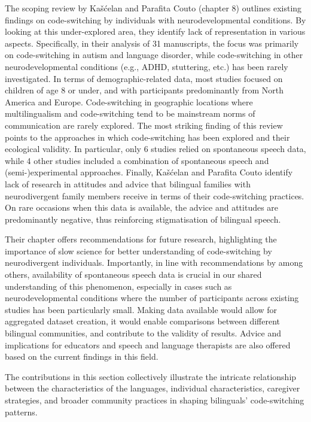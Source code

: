 \documentclass[output=paper]{langscibook}
\begin{document}
The scoping review by Kašćelan and Parafita Couto (chapter 8) outlines existing findings on code-switching by individuals with neurodevelopmental conditions. By looking at this under-explored area, they identify lack of representation in various aspects. Specifically, in their analysis of 31 manuscripts, the focus was primarily on code-switching in autism and language disorder, while code-switching in other neurodevelopmental conditions (e.g., ADHD, stuttering, etc.) has been rarely investigated. In terms of demographic-related data, most studies focused on children of age 8 or under, and with participants predominantly from North America and Europe. Code-switching in geographic locations where multilingualism and code-switching tend to be mainstream norms of communication are rarely explored. The most striking finding of this review points to the approaches in which code-switching has been explored and their ecological validity. In particular, only 6 studies relied on spontaneous speech data, while 4 other studies included a combination of spontaneous speech and (semi-)experimental approaches. Finally, Kašćelan and Parafita Couto identify lack of research in attitudes and advice that bilingual families with neurodivergent family members receive in terms of their code-switching practices. On rare occasions when this data is available, the advice and attitudes are predominantly negative, thus reinforcing stigmatisation of bilingual speech. 

Their chapter offers recommendations for future research, highlighting the importance of slow science for better understanding of code-switching by neurodivergent individuals. Importantly, in line with recommendations by \citet{Deuchar2020} among others, availability of spontaneous speech data is crucial in our shared understanding of this phenomenon, especially in cases such as neurodevelopmental conditions where the number of participants across existing studies has been particularly small. Making data available would allow for aggregated dataset creation, it would enable comparisons between different bilingual communities, and contribute to the validity of results. Advice and implications for educators and speech and language therapists are also offered based on the current findings in this field.

The contributions in this section collectively illustrate the intricate relationship between the characteristics of the languages, individual characteristics, caregiver strategies, and broader community practices in shaping bilinguals’ code-switching patterns.
\end{document}
